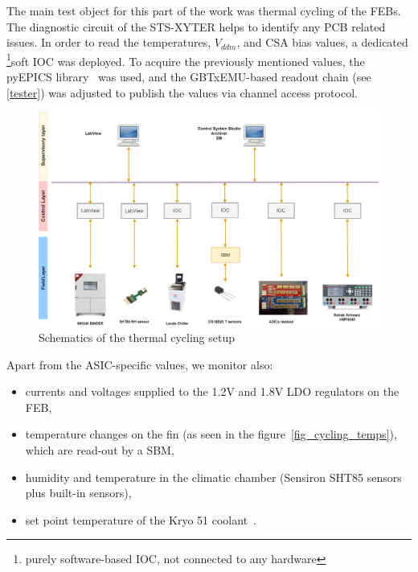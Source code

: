 The main test object for this part of the work was thermal cycling of the \gls{FEB}s. The diagnostic circuit of the STS-XYTER helps to identify any \gls{PCB} related issues. In order to read the temperatures, $V_{ddm}$, and  \gls{CSA} bias values, a dedicated \footnote{purely software-based \gls{IOC}, not connected to any hardware}{soft IOC} was deployed. To acquire the previously mentioned values, the pyEPICS library~\cite{pyEPICS} was used, and the GBTxEMU-based readout chain (see \autoref{tester}) was adjusted to publish the values via channel access protocol. 
\begin{figure}[!h]
\centering
\includegraphics[width=0.95\columnwidth]{Chapter4/images/cycling_scheme.png}
\caption{Schematics of the thermal cycling setup}
\label{fig_setup}
\end{figure}
Apart from the \gls{ASIC}-specific values, we monitor also:
\begin{itemize}
    \item currents and voltages supplied to the 1.2V and 1.8V \gls{LDO} regulators on the \gls{FEB}, 
    \item temperature changes on the fin (as seen in the figure~\ref{fig_cycling_temps}), which are read-out by a \gls{SBM},
    \item humidity and temperature in the climatic chamber (Sensiron SHT85 sensors plus built-in sensors),
    \item set point temperature of the Kryo 51 coolant~\cite{KRYO}.
\end{itemize}


